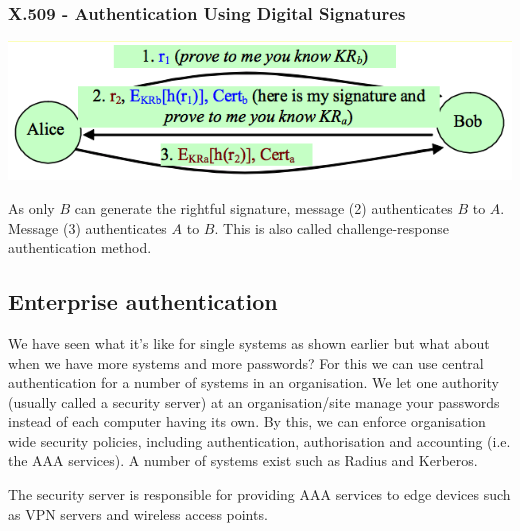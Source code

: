 \documentclass{article}
\begin{document}
\subsubsection{X.509 - Authentication Using Digital Signatures}
\begin{center}
  \includegraphics[scale=0.5]{x509-auth-sig.png}
\end{center}
As only $B$ can generate the rightful signature, message (2) authenticates $B$ to $A$. Message (3) authenticates $A$ to $B$. This is also called challenge-response authentication method.

\subsection{Enterprise authentication}
We have seen what it's like for single systems as shown earlier but what about when we have more systems and more passwords? For this we can use central authentication for a number of systems in an organisation. We let one authority (usually called a security server) at an organisation/site manage your passwords instead of each computer having its own. By this, we can enforce organisation wide security policies, including authentication, authorisation and accounting (i.e. the AAA services). A number of systems exist such as Radius and Kerberos.

The security server is responsible for providing AAA services to edge devices such as VPN servers and wireless access points.
\end{document}
